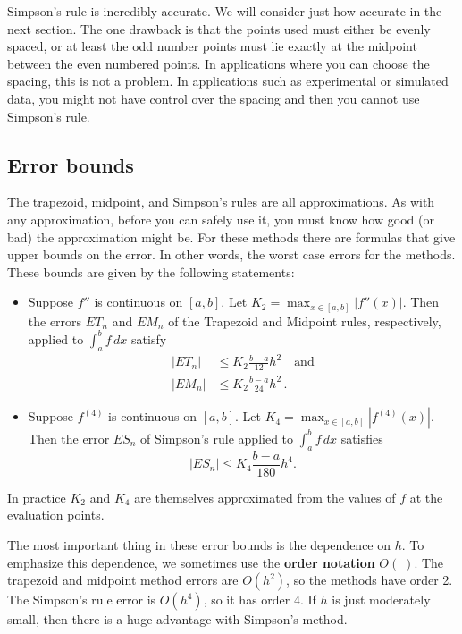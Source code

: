 


Simpson's rule is incredibly accurate. We will consider just how accurate
in the next section. The one drawback is that the points used must
either be evenly spaced, or at least the odd number points must
lie exactly at the midpoint between the even numbered points. In applications
where you can choose the spacing, this is not a problem. In applications
such as experimental or simulated data, you might not have control over
the spacing and then you cannot use Simpson's rule.



\subsection*{Error bounds}

The trapezoid, midpoint, and Simpson's rules are all approximations.
As with any approximation, before you can safely use it, you must
know how good (or bad) the approximation might be. For these methods
there are formulas that give upper bounds on the error. In other
words, the worst case errors for the methods. These bounds are given
by the following statements:

\begin{itemize}
\item Suppose $f''$ is continuous on $[a,b]$. Let $K_2 = \max_{x \in
    [a,b]}|f''(x)|$.  Then the errors $ET_n$ and $EM_n$ of the
  Trapezoid and Midpoint rules, respectively, applied to $\int_a^b f
  \, dx$ satisfy
  \begin{align*}
    |ET_n| &\le %
            K_2 \frac{b-a}{12} h^2
    \quad\text{and}\\
    |EM_n| &\le %
             K_2\frac{b-a}{24} h^2
    \,.
  \end{align*}

\item Suppose $f^{(4)}$ is continuous on $[a,b]$.
  Let $K_4 = \max_{x \in [a,b]}|f^{(4)}(x)|$.
  Then the error $ES_n$ of Simpson's rule applied
  to $\int_a^b f \, dx$ satisfies
  $$
  |ES_n| \le %
  K_4\frac{b-a}{180} h^4.
  $$

\end{itemize}
In practice $K_2$ and $K_4$ are themselves approximated from the values of
$f$ at the evaluation points.

The most important thing in these error bounds is the dependence on
\(h\).
To emphasize this dependence, we sometimes use the {\bf order
  notation} $O(\;)$.  The trapezoid and midpoint method errors are
\(O(h^2)\),
so the methods have order 2.  The Simpson's rule error is \(O(h^4)\),
so it has order 4.  If $h$ is just moderately small, then there is a
huge advantage with Simpson's method.

